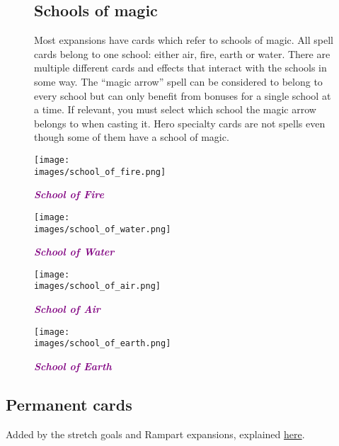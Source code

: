 
\begin{figure}[h]
  \begin{minipage}[t]{0.48\textwidth}
    \vspace{0pt}
    \subsection*{Schools of magic}
    Most expansions have cards which refer to schools of magic.
    All spell cards belong to one school: either air, fire, earth or water.
    There are multiple different cards and effects that interact with the schools in some way.
    The “magic arrow” spell can be considered to belong to every school but can only benefit from bonuses for a single school at a time.
    If relevant, you must select which school the magic arrow belongs to when casting it.
    Hero specialty cards are not spells even though some of them have a school of magic.
  \end{minipage}
  \begin{minipage}[t]{0.48\textwidth}
    \vspace{0pt}
    \centering
      \centering
      \texttt{[image: \\images/school\_of\_fire.png]}
      \caption{{\textit{\textbf{\textcolor{purple}{School of Fire}}}}}
    \endminipage
      \centering
      \texttt{[image: \\images/school\_of\_water.png]}
      \caption{{\textit{\textbf{\textcolor{purple}{School of Water}}}}}
    \endminipage
    \hfill\allowbreak%
    \bigbreak
      \centering
      \texttt{[image: \\images/school\_of\_air.png]}
      \caption{{\textit{\textbf{\textcolor{purple}{School of Air}}}}}
    \endminipage
      \centering
      \texttt{[image: \\images/school\_of\_earth.png]}
      \caption{{\textit{\textbf{\textcolor{purple}{School of Earth}}}}}
    \endminipage
  \end{minipage}
\end{figure}

\subsection*{Permanent cards}
Added by the stretch goals and Rampart expansions, explained \hyperlink{Playerdecks}{here}.

